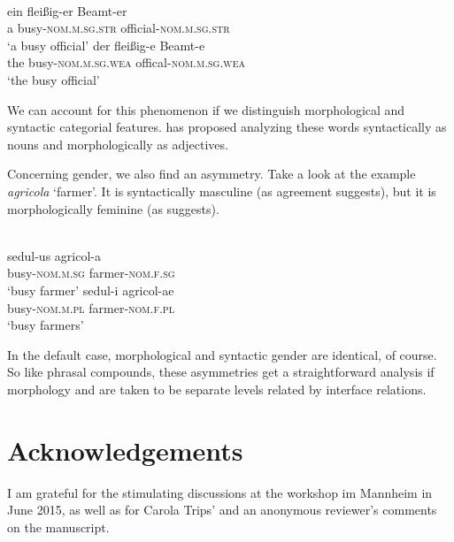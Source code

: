 \documentclass[output=paper]{LSP/langsci}
\begin{document}
\ea\label{ex:pafel:43}
      \\
      \ea      
      \gll  ein fleißig-er Beamt-er\\
            a busy-\textsc{nom.m.sg.str} official-\textsc{nom.m.sg.str}     \\
      \glt  `a busy official'
      \ex
      \gll   der fleißig-e Beamt-e   \\
             the busy-\textsc{nom.m.sg.wea} offical-\textsc{nom.m.sg.wea}  \\
      \glt  `the busy official'
    \z
\z

We can account for this phenomenon if we distinguish morphological and syntactic categorial features. \citet{Spencer2010} has proposed analyzing these words syntactically as nouns and morphologically as adjectives.

Concerning gender, we also find an asymmetry. Take a look at the  example \textit{agricola} `farmer'. It is syntactically masculine (as agreement suggests), but it is morphologically feminine (as  suggests).


\ea\label{ex:pafel:44}
      \\
      \ea      
      \gll  sedul-us agricol-a\\
            busy-\textsc{nom.m.sg} farmer-\textsc{nom.f.sg}     \\
      \glt  `busy farmer'
      \ex
      \gll   sedul-i agricol-ae   \\
             busy-\textsc{nom.m.pl} farmer-\textsc{nom.f.pl}  \\
      \glt  `busy farmers'
    \z
\z      

In the default case, morphological and syntactic gender are identical,
of course. So like phrasal compounds, these asymmetries get a
straightforward analysis if morphology and  are taken to be
separate levels related by interface relations.
\section*{Acknowledgements}
I am grateful for the stimulating discussions at the workshop im Mannheim in June 2015, as well as for Carola Trips' and an anonymous reviewer's comments on the manuscript.
\end{document}
